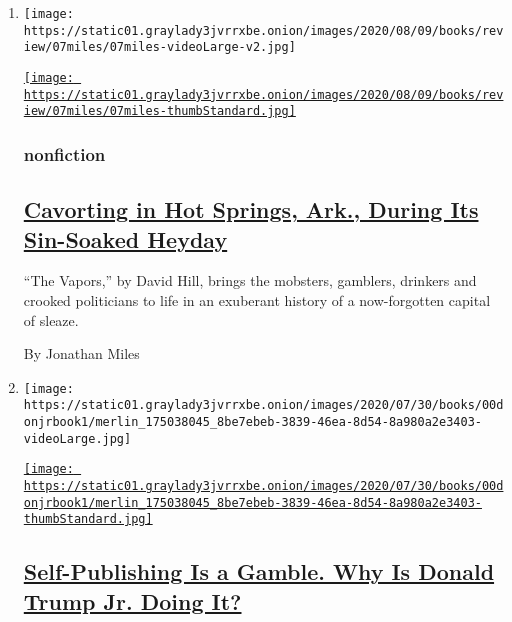 \begin{enumerate}
\def\labelenumi{\arabic{enumi}.}
\item
  \texttt{[image: https://static01.graylady3jvrrxbe.onion/images/2020/08/09/books/review/07miles/07miles-videoLarge-v2.jpg]}

  \href{/2020/07/07/books/review/the-vapors-david-hill.html}{\texttt{[image: https://static01.graylady3jvrrxbe.onion/images/2020/08/09/books/review/07miles/07miles-thumbStandard.jpg]}}

  \hypertarget{nonfiction}{%
  \subsubsection{nonfiction}\label{nonfiction}}

  \hypertarget{cavorting-in-hot-springs-ark-during-its-sin-soaked-heyday}{%
  \subsection{\texorpdfstring{\href{/2020/07/07/books/review/the-vapors-david-hill.html}{Cavorting
  in Hot Springs, Ark., During Its Sin-Soaked
  Heyday}}{Cavorting in Hot Springs, Ark., During Its Sin-Soaked Heyday}}\label{cavorting-in-hot-springs-ark-during-its-sin-soaked-heyday}}

  ``The Vapors,'' by David Hill, brings the mobsters, gamblers, drinkers
  and crooked politicians to life in an exuberant history of a
  now-forgotten capital of sleaze.

  By Jonathan Miles
\item
  \texttt{[image: https://static01.graylady3jvrrxbe.onion/images/2020/07/30/books/00donjrbook1/merlin\_175038045\_8be7ebeb-3839-46ea-8d54-8a980a2e3403-videoLarge.jpg]}

  \href{/2020/08/06/books/donald-trump-jr-liberal-privilege.html}{\texttt{[image: https://static01.graylady3jvrrxbe.onion/images/2020/07/30/books/00donjrbook1/merlin\_175038045\_8be7ebeb-3839-46ea-8d54-8a980a2e3403-thumbStandard.jpg]}}

  \hypertarget{self-publishing-is-a-gamble-why-is-donald-trump-jr-doing-it}{%
  \subsection{\texorpdfstring{\href{/2020/08/06/books/donald-trump-jr-liberal-privilege.html}{Self-Publishing
  Is a Gamble. Why Is Donald Trump Jr. Doing
  It?}}{Self-Publishing Is a Gamble. Why Is Donald Trump Jr. Doing It?}}\label{self-publishing-is-a-gamble-why-is-donald-trump-jr-doing-it}}


\end{enumerate}
